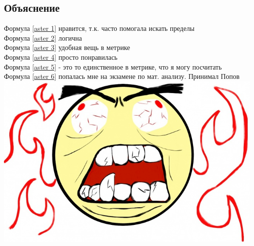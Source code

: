 \documentclass[12pt, a4paper]{article}
\begin{document}
\subsection{Объяснение}
Формула \eqref{aster 1} нравится, т.к. часто помогала искать пределы \\
Формула \ref{aster 2} логична \\
Формула \ref{aster 3} удобная вещь в метрике \\
Формула \ref{aster 4} просто понравилась \\
Формула \ref{aster 5} - это то единственное в метрике, что я могу посчитать \\
Формула \ref{aster 6} попалась мне на экзамене по мат. анализу. Принимал Попов \includegraphics[scale=0.05]{cep}
\end{document}
